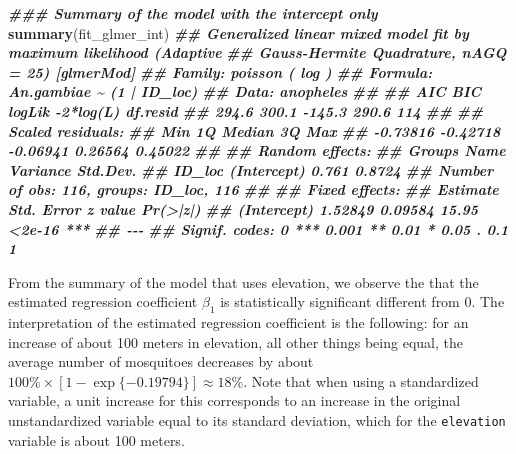 \documentclass[
  letterpaper,
]{krantz}
\newenvironment{Shaded}{\begin{snugshade}}{\end{snugshade}}
\newcommand{\DocumentationTok}[1]{\textcolor[rgb]{0.56,0.35,0.01}{\textbf{\textit{#1}}}}
\newcommand{\FunctionTok}[1]{\textcolor[rgb]{0.13,0.29,0.53}{\textbf{#1}}}
\newcommand{\NormalTok}[1]{#1}
\begin{document}
\begin{Shaded}
\begin{Highlighting}[]
\DocumentationTok{\#\#\# Summary of the model with the intercept only}
\FunctionTok{summary}\NormalTok{(fit\_glmer\_int)}
\DocumentationTok{\#\# Generalized linear mixed model fit by maximum likelihood (Adaptive}
\DocumentationTok{\#\#   Gauss{-}Hermite Quadrature, nAGQ = 25) [glmerMod]}
\DocumentationTok{\#\#  Family: poisson  ( log )}
\DocumentationTok{\#\# Formula: An.gambiae \textasciitilde{} (1 | ID\_loc)}
\DocumentationTok{\#\#    Data: anopheles}
\DocumentationTok{\#\# }
\DocumentationTok{\#\#       AIC       BIC    logLik {-}2*log(L)  df.resid }
\DocumentationTok{\#\#     294.6     300.1    {-}145.3     290.6       114 }
\DocumentationTok{\#\# }
\DocumentationTok{\#\# Scaled residuals: }
\DocumentationTok{\#\#      Min       1Q   Median       3Q      Max }
\DocumentationTok{\#\# {-}0.73816 {-}0.42718 {-}0.06941  0.26564  0.45022 }
\DocumentationTok{\#\# }
\DocumentationTok{\#\# Random effects:}
\DocumentationTok{\#\#  Groups Name        Variance Std.Dev.}
\DocumentationTok{\#\#  ID\_loc (Intercept) 0.761    0.8724  }
\DocumentationTok{\#\# Number of obs: 116, groups:  ID\_loc, 116}
\DocumentationTok{\#\# }
\DocumentationTok{\#\# Fixed effects:}
\DocumentationTok{\#\#             Estimate Std. Error z value Pr(\textgreater{}|z|)    }
\DocumentationTok{\#\# (Intercept)  1.52849    0.09584   15.95   \textless{}2e{-}16 ***}
\DocumentationTok{\#\# {-}{-}{-}}
\DocumentationTok{\#\# Signif. codes:  0 \textquotesingle{}***\textquotesingle{} 0.001 \textquotesingle{}**\textquotesingle{} 0.01 \textquotesingle{}*\textquotesingle{} 0.05 \textquotesingle{}.\textquotesingle{} 0.1 \textquotesingle{} \textquotesingle{} 1}
\end{Highlighting}
\end{Shaded}

From the summary of the model that uses elevation, we observe the that
the estimated regression coefficient \(\beta_{1}\) is statistically
significant different from 0. The interpretation of the estimated
regression coefficient is the following: for an increase of about 100
meters in elevation, all other things being equal, the average number of
mosquitoes decreases by about
\(100\% \times [1-\exp\{-0.19794\}] \approx 18\%\). Note that when using
a standardized variable, a unit increase for this corresponds to an
increase in the original unstandardized variable equal to its standard
deviation, which for the \texttt{elevation} variable is about 100
meters.
\end{document}
